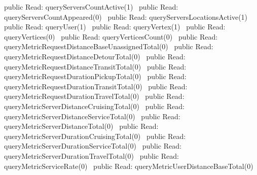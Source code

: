 public \LA{}Read: queryServersCountActive(1)~{\nwtagstyle{}}\RA{}
public \LA{}Read: queryServersCountAppeared(0)~{\nwtagstyle{}}\RA{}
public \LA{}Read: queryServersLocationsActive(1)~{\nwtagstyle{}}\RA{}
public \LA{}Read: queryUser(1)~{\nwtagstyle{}}\RA{}
public \LA{}Read: queryVertex(1)~{\nwtagstyle{}}\RA{}
public \LA{}Read: queryVertices(0)~{\nwtagstyle{}}\RA{}
public \LA{}Read: queryVerticesCount(0)~{\nwtagstyle{}}\RA{}
\nwendcode{}\nwdocspar
{}
\nwenddocs{}\plusendmoddef
public \LA{}Read: queryMetricRequestDistanceBaseUnassignedTotal(0)~{\nwtagstyle{}}\RA{}
public \LA{}Read: queryMetricRequestDistanceDetourTotal(0)~{\nwtagstyle{}}\RA{}
public \LA{}Read: queryMetricRequestDistanceTransitTotal(0)~{\nwtagstyle{}}\RA{}
public \LA{}Read: queryMetricRequestDurationPickupTotal(0)~{\nwtagstyle{}}\RA{}
public \LA{}Read: queryMetricRequestDurationTransitTotal(0)~{\nwtagstyle{}}\RA{}
public \LA{}Read: queryMetricRequestDurationTravelTotal(0)~{\nwtagstyle{}}\RA{}
public \LA{}Read: queryMetricServerDistanceCruisingTotal(0)~{\nwtagstyle{}}\RA{}
public \LA{}Read: queryMetricServerDistanceServiceTotal(0)~{\nwtagstyle{}}\RA{}
public \LA{}Read: queryMetricServerDistanceTotal(0)~{\nwtagstyle{}}\RA{}
public \LA{}Read: queryMetricServerDurationCruisingTotal(0)~{\nwtagstyle{}}\RA{}
public \LA{}Read: queryMetricServerDurationServiceTotal(0)~{\nwtagstyle{}}\RA{}
public \LA{}Read: queryMetricServerDurationTravelTotal(0)~{\nwtagstyle{}}\RA{}
public \LA{}Read: queryMetricServiceRate(0)~{\nwtagstyle{}}\RA{}
public \LA{}Read: queryMetricUserDistanceBaseTotal(0)~{\nwtagstyle{}}\RA{}
\nwendcode{}\nwdocspar
{}
\nwenddocs{}\plusendmoddef
